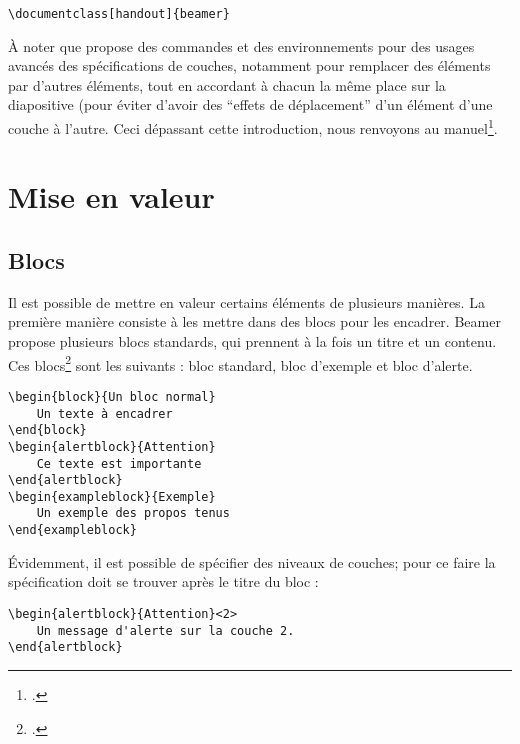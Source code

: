\begin{verbatim}
\documentclass[handout]{beamer}
\end{verbatim}

À noter que  propose des commandes et des environnements pour des usages avancés des spécifications de couches, notamment pour remplacer des éléments par d'autres éléments, tout en accordant à chacun la même place sur la diapositive (pour éviter d'avoir des \enquote{effets de déplacement} d'un élément d'une couche à l'autre. 
Ceci dépassant cette introduction, nous renvoyons au manuel\footcite{beamer_overlays}.
\section{Mise en valeur}

\subsection{Blocs}

Il est possible de mettre en valeur certains éléments de plusieurs manières. La première manière consiste à les mettre dans des blocs pour les encadrer. Beamer propose plusieurs blocs standards, qui prennent à la fois un titre et un contenu. Ces blocs\footcites[Il est possible de créer ses propres blocs, voir : ][]{beamer_box}[il existe aussi des éléments proches des blocs que sont les encadrés, pour mettre en valeur des définitions, des théorèmes, ][]{beamer_theorems} sont les suivants : bloc standard, bloc d'exemple et bloc d'alerte.

\begin{verbatim}
\begin{block}{Un bloc normal} 
	Un texte à encadrer
\end{block}
\begin{alertblock}{Attention} 
	Ce texte est importante
\end{alertblock}
\begin{exampleblock}{Exemple} 
	Un exemple des propos tenus
\end{exampleblock}
\end{verbatim}

Évidemment, il est possible de spécifier des niveaux de couches; pour ce faire la spécification doit se trouver après le titre du bloc :

\begin{verbatim}
\begin{alertblock}{Attention}<2>
	Un message d'alerte sur la couche 2.
\end{alertblock}
\end{verbatim}


